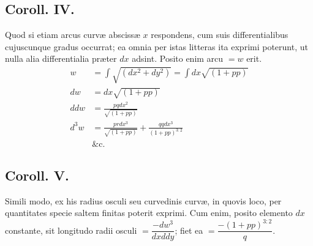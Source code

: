 \subsection*{Coroll. IV.}
Quod si etiam arcus curvæ abscissæ $x$ respondens, cum suis differentialibus cujuscunque gradus occurrat; ea omnia per istas litteras ita exprimi poterunt, ut nulla alia differentialia præter $dx$ adsint. Posito enim arcu $=w$ erit.
\[
\begin{aligned}
 w&=\int\sqrt{(dx^2+dy^2)}=\int dx\sqrt{(1+pp)}\\
 dw&=dx\sqrt{(1+pp)}\\
 ddw&=\frac{pqdx^2}{\sqrt{(1+pp)}}\\
 d^3w&=\frac{prdx^3}{\sqrt{(1+pp)}}+\frac{qqdx^3}{(1+pp)^{3:2}}\\
 &\text{\&c.}
\end{aligned}
\]
\subsection*{Coroll. V.}
Simili modo, ex his radius osculi seu curvedinis curvæ, in quovis loco, per quantitates specie saltem finitas poterit exprimi. Cum enim, posito elemento $dx$ constante, sit longitudo radii osculi $=\dfrac{-dw^3}{dxddy}$; fiet ea $=\dfrac{-(1+pp)^{3:2}}{q}$.
